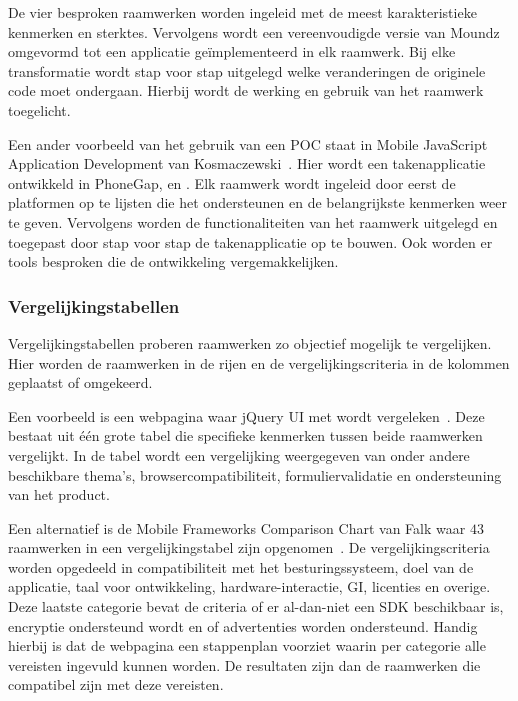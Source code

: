 De vier besproken raamwerken worden ingeleid met de meest karakteristieke kenmerken en sterktes.
Vervolgens wordt een vereenvoudigde versie van Moundz omgevormd tot een applicatie geïmplementeerd in elk raamwerk.
Bij elke transformatie wordt stap voor stap uitgelegd welke veranderingen de originele code moet ondergaan.
Hierbij wordt de werking en gebruik van het raamwerk toegelicht.

Een ander voorbeeld van het gebruik van een POC staat in Mobile JavaScript Application Development van Kosmaczewski~\cite{Kosmaczewski2012}.
Hier wordt een takenapplicatie ontwikkeld in PhoneGap, \st{} en \jqm{}.
Elk raamwerk wordt ingeleid door eerst de platformen op te lijsten die het ondersteunen en de belangrijkste kenmerken weer te geven.
Vervolgens worden de functionaliteiten van het raamwerk uitgelegd en toegepast door stap voor stap de takenapplicatie op te bouwen.
Ook worden er tools besproken die de ontwikkeling vergemakkelijken.

\subsubsection{Vergelijkingstabellen}
\label{sec:manier-vergelijkingstabellen}
Vergelijkingstabellen proberen raamwerken zo objectief mogelijk te vergelijken.
Hier worden de raamwerken in de rijen en de vergelijkingscriteria in de kolommen geplaatst of omgekeerd.

Een voorbeeld is een webpagina waar jQuery UI met \kendo{} wordt vergeleken~\cite{Bristowe2012}.
Deze bestaat uit één grote tabel die specifieke kenmerken tussen beide raamwerken vergelijkt.
In de tabel wordt een vergelijking weergegeven van onder andere beschikbare thema's,  browsercompatibiliteit,  formuliervalidatie en  ondersteuning van het product.

Een alternatief is de Mobile Frameworks Comparison Chart van Falk waar $43$ raamwerken in een vergelijkingstabel zijn opgenomen~\cite{Falk2011}. 
De vergelijkingscriteria worden opgedeeld in compatibiliteit met het besturingssysteem,  doel van de applicatie,  taal voor ontwikkeling,  hardware-interactie,  GI,  licenties en overige.  
Deze laatste categorie bevat de criteria of er al-dan-niet een SDK beschikbaar is, encryptie ondersteund wordt en of advertenties worden ondersteund.  
Handig hierbij is dat de webpagina een stappenplan voorziet waarin per categorie alle vereisten ingevuld kunnen worden.  
De resultaten zijn dan de raamwerken die compatibel zijn met deze vereisten.

